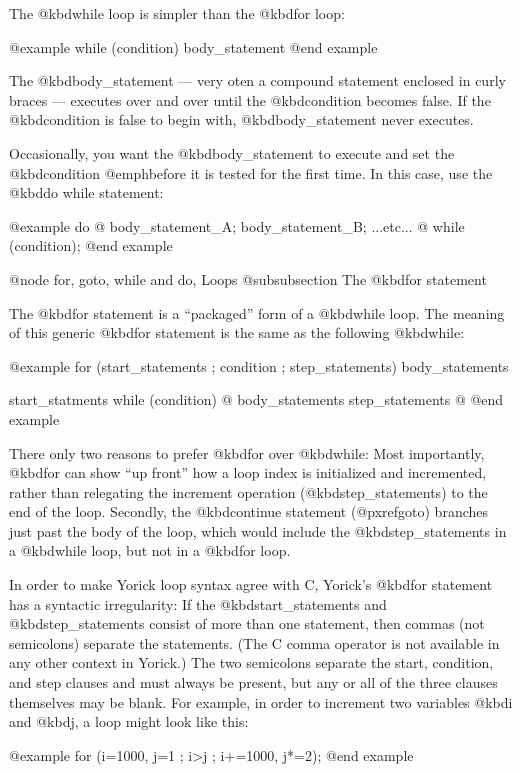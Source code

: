 {The @kbd{while} loop is simpler than the @kbd{for} loop:

@example
while (condition) body_statement
@end example

The @kbd{body_statement} --- very oten a compound statement enclosed
in curly braces --- executes over and over until the @kbd{condition}
becomes false.  If the @kbd{condition} is false to begin with,
@kbd{body_statement} never executes.

Occasionally, you want the @kbd{body_statement} to execute and set the
@kbd{condition} @emph{before} it is tested for the first time.  In
this case, use the @kbd{do while} statement:

@example
do @{
  body_statement_A;
  body_statement_B;
  ...etc...
@} while (condition);
@end example


@node for, goto, while and do, Loops
@subsubsection The @kbd{for} statement

The @kbd{for} statement is a ``packaged'' form of a @kbd{while} loop.
The meaning of this generic @kbd{for} statement is the same as the
following @kbd{while}:

@example
for (start_statements ; condition ; step_statements) body_statements

start_statments
while (condition) @{
  body_statements
  step_statements
@}
@end example

There only two reasons to prefer @kbd{for} over @kbd{while}: Most
importantly, @kbd{for} can show ``up front'' how a loop index is
initialized and incremented, rather than relegating the increment
operation (@kbd{step_statements}) to the end of the loop.  Secondly,
the @kbd{continue} statement (@pxref{goto}) branches just past the body of
the loop, which would include the @kbd{step_statements} in a
@kbd{while} loop, but not in a @kbd{for} loop.

In order to make Yorick loop syntax agree with C, Yorick's @kbd{for}
statement has a syntactic irregularity: If the @kbd{start_statements}
and @kbd{step_statements} consist of more than one statement, then
commas (not semicolons) separate the statements.  (The C comma
operator is not available in any other context in Yorick.)  The two
semicolons separate the start, condition, and step clauses and must
always be present, but any or all of the three clauses themselves may
be blank.  For example, in order to increment two variables @kbd{i}
and @kbd{j}, a loop might look like this:

@example
for (i=1000, j=1 ; i>j ; i+=1000, j*=2);
@end example

}
